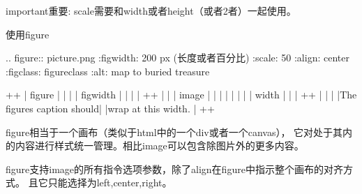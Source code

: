 \documentclass[a4paper,10pt,english]{sphinxmanual}
\begin{document}
\begin{sphinxadmonition}{important}{重要:}
\sphinxAtStartPar
scale需要和width或者height（或者2者）一起使用。
\end{sphinxadmonition}

\sphinxAtStartPar
使用figure

\begin{sphinxVerbatim}[commandchars=\\\{\}]
.. figure:: picture.png
   :figwidth: 200 px (长度或者百分比)
   :scale: 50 \PYGZpc{}
       :align: center
       :figclass: figure\PYGZhy{}class
   :alt: map to buried treasure

    +\PYGZhy{}\PYGZhy{}\PYGZhy{}\PYGZhy{}\PYGZhy{}\PYGZhy{}\PYGZhy{}\PYGZhy{}\PYGZhy{}\PYGZhy{}\PYGZhy{}\PYGZhy{}\PYGZhy{}\PYGZhy{}\PYGZhy{}\PYGZhy{}\PYGZhy{}\PYGZhy{}\PYGZhy{}\PYGZhy{}\PYGZhy{}\PYGZhy{}\PYGZhy{}\PYGZhy{}\PYGZhy{}\PYGZhy{}\PYGZhy{}+
    |        figure             |
    |                           |
    |\PYGZlt{}\PYGZhy{}\PYGZhy{}\PYGZhy{}\PYGZhy{}\PYGZhy{}\PYGZhy{} figwidth \PYGZhy{}\PYGZhy{}\PYGZhy{}\PYGZhy{}\PYGZhy{}\PYGZhy{}\PYGZhy{}\PYGZhy{}\PYGZhy{}\PYGZgt{}|
    |                           |
    |  +\PYGZhy{}\PYGZhy{}\PYGZhy{}\PYGZhy{}\PYGZhy{}\PYGZhy{}\PYGZhy{}\PYGZhy{}\PYGZhy{}\PYGZhy{}\PYGZhy{}\PYGZhy{}\PYGZhy{}\PYGZhy{}\PYGZhy{}\PYGZhy{}\PYGZhy{}\PYGZhy{}\PYGZhy{}\PYGZhy{}\PYGZhy{}+  |
    |  |     image           |  |
    |  |                     |  |
    |  |\PYGZlt{}\PYGZhy{}\PYGZhy{}\PYGZhy{} width \PYGZhy{}\PYGZhy{}\PYGZhy{}\PYGZhy{}\PYGZhy{}\PYGZhy{}\PYGZhy{}\PYGZhy{}\PYGZhy{}\PYGZgt{}|  |
    |  +\PYGZhy{}\PYGZhy{}\PYGZhy{}\PYGZhy{}\PYGZhy{}\PYGZhy{}\PYGZhy{}\PYGZhy{}\PYGZhy{}\PYGZhy{}\PYGZhy{}\PYGZhy{}\PYGZhy{}\PYGZhy{}\PYGZhy{}\PYGZhy{}\PYGZhy{}\PYGZhy{}\PYGZhy{}\PYGZhy{}\PYGZhy{}+  |
    |                           |
    |The figure\PYGZsq{}s caption should|
    |wrap at this width.        |
    +\PYGZhy{}\PYGZhy{}\PYGZhy{}\PYGZhy{}\PYGZhy{}\PYGZhy{}\PYGZhy{}\PYGZhy{}\PYGZhy{}\PYGZhy{}\PYGZhy{}\PYGZhy{}\PYGZhy{}\PYGZhy{}\PYGZhy{}\PYGZhy{}\PYGZhy{}\PYGZhy{}\PYGZhy{}\PYGZhy{}\PYGZhy{}\PYGZhy{}\PYGZhy{}\PYGZhy{}\PYGZhy{}\PYGZhy{}\PYGZhy{}+
\end{sphinxVerbatim}

\sphinxAtStartPar
figure相当于一个画布（类似于html中的一个div或者一个canvas），
它对处于其内的内容进行样式统一管理。相比image可以包含除图片外的更多内容。

\sphinxAtStartPar
figure支持image的所有指令选项参数，除了align在figure中指示整个画布的对齐方式。
且它只能选择为left,center,right。
\end{document}
